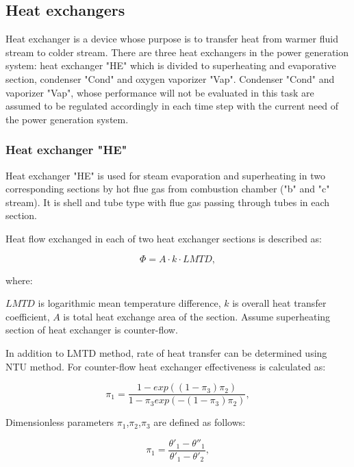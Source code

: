 \documentclass{article}
\begin{document}
	\subsection{Heat exchangers}
	
	Heat exchanger is a device whose purpose is to transfer heat from warmer 
	fluid stream to colder stream. There are three heat exchangers in the power 
	generation system: heat exchanger "HE" which is divided to superheating and 
	evaporative section, condenser "Cond" and oxygen vaporizer "Vap". Condenser 
	"Cond" and vaporizer "Vap", whose performance will not be evaluated in this 
	task are assumed to be regulated accordingly in each time step with the 
	current need of the power generation system. 
	
	\subsubsection*{Heat exchanger "HE"}
	
	Heat exchanger "HE" is used for steam evaporation and superheating in two corresponding sections by hot flue gas from combustion chamber ("b" and "c" stream). It is shell and tube type with flue gas passing through tubes in each section. 
	
	Heat flow exchanged in each of two heat exchanger sections is described as:
	
	\begin{equation}\label{eq:heat_flow}
		\Phi = A \cdot k \cdot LMTD,
	\end{equation}
	
	where:
	
	\noindent
	$LMTD$ is logarithmic mean temperature difference, 
	$k$ is overall heat transfer coefficient,
	$A$ is total heat exchange area of the section. 
	Assume superheating section of heat exchanger is counter-flow.
	
	In addition to LMTD method, rate of heat transfer can be determined using NTU method. For counter-flow heat exchanger effectiveness is calculated as:
	
	\begin{equation}\label{eq:heat_exchanger_eff}
		\pi_1 = \frac{1 - exp((1-\pi_3)\pi_2)}{1-\pi_3exp(-(1-\pi_3)\pi_2)},
	\end{equation}
	
	Dimensionless parameters $\pi_1$,$\pi_2$,$\pi_3$ are defined as follows:
	
	\begin{equation}\label{eq:pi_params}
		\pi_1 = \frac{\theta'_1 - \theta''_1}{\theta'_1 - \theta'_2},
	\end{equation}
	
\end{document}
